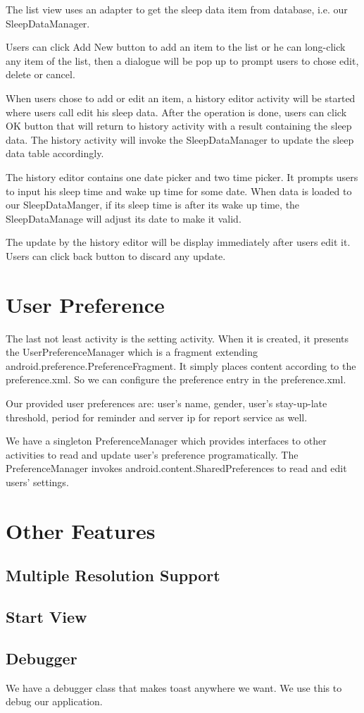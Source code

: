 \documentclass[14pt]{extreport}
\begin{document}
The list view uses an adapter to get the sleep data item from database, i.e. our SleepDataManager.

Users can click Add New button to add an item to the list or he can long-click any item of the list, then a dialogue will be pop up to prompt users to chose edit, delete or cancel. 

When users chose to add or edit an item, a history editor activity will be started where users call edit his sleep data. After the operation is done, users can click OK button that will return to history activity with a result containing the sleep data. The history activity will invoke the SleepDataManager to update the sleep data table accordingly. 

The history editor contains one date picker and two time picker. It prompts users to input his sleep time and wake up time for some date. When data is loaded to our SleepDataManger, if its sleep time is after its wake up time, the SleepDataManage will adjust its date to make it valid.

The update by the history editor will be display immediately after users edit it. Users can click back button to discard any update.

\chapter{User Preference}
The last not least activity is the setting activity. When it is created, it presents the UserPreferenceManager which is a fragment extending android.preference.PreferenceFragment. It simply places content according to the preference.xml. So we can configure the preference entry in the preference.xml.

Our provided user preferences are: user's name, gender, user's stay-up-late threshold, period for reminder and server ip for report service as well.

We have a singleton PreferenceManager which provides interfaces to other activities to read and update user's preference programatically. The PreferenceManager invokes android.content.SharedPreferences to read and edit users' settings.

\chapter{Other Features}
\section{Multiple Resolution Support}
\section{Start View}
\section{Debugger}
We have a debugger class that makes toast anywhere we want. We use this to debug our application.
\end{document}
